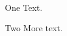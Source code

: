 \documentclass{beamer}
\begin{document}
\begin{frame}{One}
Text.
\end{frame}
\begin{frame}{Two}
More text.
\end{frame}
\end{document}
